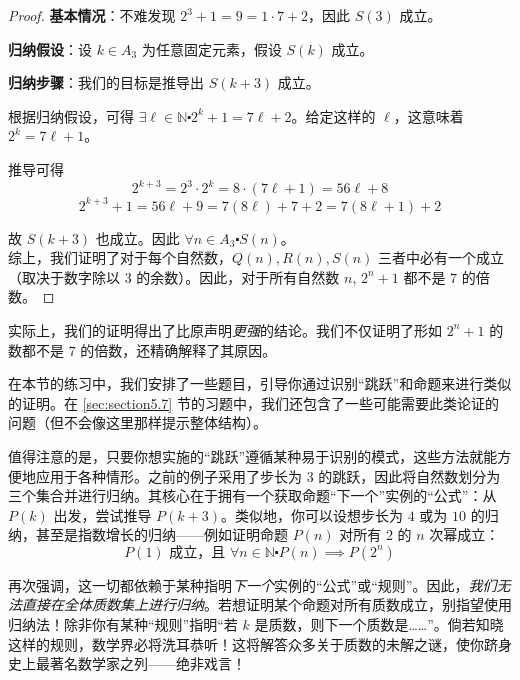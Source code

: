 \begin{example}
\begin{proof}
        \textbf{基本情况}：不难发现 $2^3+1=9 = 1 \cdot 7 + 2$，因此 $S(3)$ 成立。

        \textbf{归纳假设}：设 $k \in A_3$ 为任意固定元素，假设 $S(k)$ 成立。

        \textbf{归纳步骤}：我们的目标是推导出 $S(k+3)$ 成立。

        根据归纳假设，可得 $\exists \ell \in \mathbb{N} \centerdot 2^k + 1 = 7\ell + 2$。给定这样的 $\ell$，这意味着 $2^k = 7\ell + 1$。

        推导可得
        \[2^{k+3} = 2^3 \cdot 2^k = 8 \cdot (7\ell + 1) = 56\ell + 8\]
        \[2^{k+3} + 1 = 56\ell + 9 = 7(8\ell) + 7 + 2 = 7(8\ell + 1) + 2\]

        故 $S(k + 3)$ 也成立。因此 $\forall n \in A_3 \centerdot S(n)$。\\

        综上，我们证明了对于每个自然数，$Q(n), R(n), S(n)$ 三者中必有一个成立（取决于数字除以 $3$ 的余数）。因此，对于所有自然数 $n$, $2^n + 1$ 都不是 $7$ 的倍数。
    \end{proof}
\end{example}

实际上，我们的证明得出了比原声明\emph{更强}的结论。我们不仅证明了形如 $2^n + 1$ 的数都不是 $7$ 的倍数，还精确解释了其原因。

在本节的练习中，我们安排了一些题目，引导你通过识别``跳跃''和命题来进行类似的证明。在 \ref{sec:section5.7} 节的习题中，我们还包含了一些可能需要此类论证的问题（但不会像这里那样提示整体结构）。

值得注意的是，只要你想实施的``跳跃''遵循某种易于识别的模式，这些方法就能方便地应用于各种情形。之前的例子采用了步长为 $3$ 的跳跃，因此将自然数划分为三个集合并进行归纳。其核心在于拥有一个获取命题``下一个''实例的``公式''：从 $P(k)$ 出发，尝试推导 $P(k + 3)$。类似地，你可以设想步长为 $4$ 或为 $10$ 的归纳，甚至是指数增长的归纳——例如证明命题 $P(n)$ 对所有 $2$ 的 $n$ 次幂成立：
\[P(1) \text{\ 成立，且\ } \forall n \in \mathbb{N} \centerdot P(n) \implies P(2^n)\]

再次强调，这一切都依赖于某种指明\emph{下一个}实例的``公式''或``规则''。因此，\emph{我们无法直接在全体质数集上进行归纳}。若想证明某个命题对所有质数成立，别指望使用归纳法！除非你有某种``规则''指明``若 $k$ 是质数，则下一个质数是……''。倘若知晓这样的规则，数学界必将洗耳恭听！这将解答众多关于质数的未解之谜，使你跻身史上最著名数学家之列——绝非戏言！
